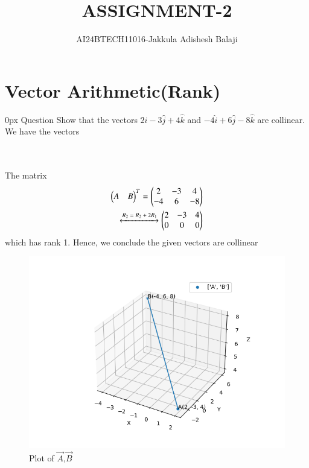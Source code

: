 \documentclass[journal]{IEEEtran}
\begin{document}

\renewcommand{\thefigure}{\theenumi}
\renewcommand{\thetable}{\theenumi}
\setlength{\intextsep}{10pt} %
\renewcommand{\thetable}{\theenumi}
\title{ASSIGNMENT-2}
\author{AI24BTECH11016-Jakkula Adishesh Balaji}
\maketitle
\bigskip
\section*{\textbf{Vector Arithmetic(Rank)}}
         \parindent 0px
         Question Show that the vectors $2\hat{i}-3\hat{j}+4\hat{k}$ and $-4\hat{i}+6\hat{j}-8\hat{k}$ are collinear.\\
\solution We have the vectors \\ \\
         \begin{table}[h!]
         
         \label{tab1.6.2.2}
         \end{table}
\\  
The matrix 
         \begin{align*}
         {\ensuremath{\begin{pmatrix}A&B\end{pmatrix}}}^{T} =
         \begin{pmatrix}2&-3&4\\-4&6&-8\end{pmatrix} \\
         \xleftrightarrow{\text{$R_2=R_2+2R_1$}}
         \begin{pmatrix}2&-3&4\\0&0&0\end{pmatrix}\\
         \end{align*}
         which has rank 1. Hence, we conclude the given vectors are collinear
         \begin{figure}[h]
           \centering
           \includegraphics[width=\columnwidth]{figs/fig.png}
           \caption{Plot of $\vec{A}$,$\vec{B}$}
 \end{figure}
\end{document}
